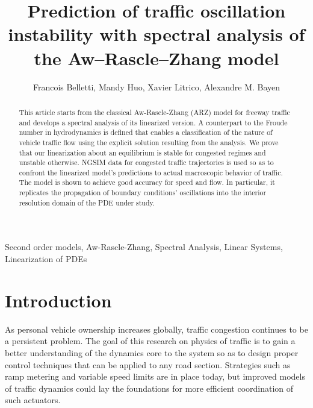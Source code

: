\documentclass[preprint]{elsarticle}
\begin{document}
\begin{frontmatter}
\title{Prediction of traffic oscillation instability with spectral analysis of the Aw--Rascle--Zhang model}

\author[add]{Francois Belletti, Mandy Huo, Xavier Litrico, Alexandre M. Bayen}
\address[add]{address}
%
%
%

\begin{abstract}
This article starts from the classical Aw-Rascle-Zhang (ARZ) model for freeway traffic and develops a spectral analysis of its linearized version. A counterpart to the Froude number in hydrodynamics is defined that enables a classification of the nature of vehicle traffic flow using the explicit solution resulting from the analysis. We prove that our linearization about an equilibrium is stable for congested regimes and unstable otherwise. NGSIM data for congested traffic trajectories is used so as to confront the linearized model's predictions to actual macroscopic behavior of traffic. The model is shown to achieve good accuracy for speed and flow. In particular, it replicates the propagation of boundary conditions' oscillations into the interior resolution domain of the PDE under study.
\end{abstract}

\begin{keyword}
Second order models, Aw-Rascle-Zhang, Spectral Analysis, Linear Systems, Linearization of PDEs
\end{keyword}

\end{frontmatter}


\section{Introduction}

As personal vehicle ownership increases globally, traffic congestion
continues to be a persistent problem. The goal of this research on physics of traffic is to gain a better understanding of the dynamics core to the system so as to design proper control techniques that can be applied to any road section. Strategies such as
ramp metering and variable speed limits are in place today, but improved models of traffic dynamics could lay the foundations for more efficient coordination of such actuators. 
\end{document}
